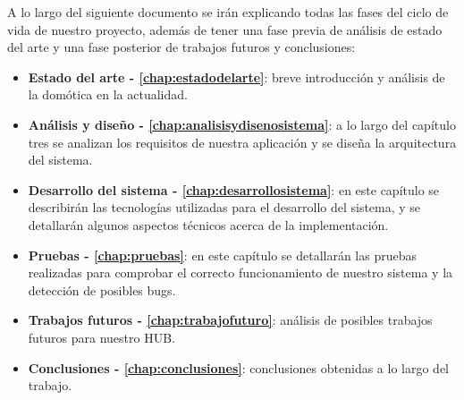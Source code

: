 
A lo largo del siguiente documento se irán explicando todas las fases del ciclo de vida de nuestro proyecto, además de tener una fase previa de análisis de estado del 
arte y una fase posterior de trabajos futuros y conclusiones:
\begin{itemize}
\item\textbf{Estado del arte - \autoref{chap:estadodelarte}}: breve introducción y análisis de la domótica en la actualidad.
\item\textbf{Análisis y diseño - \autoref{chap:analisisydisenosistema}}: a lo largo del capítulo tres se analizan los requisitos de nuestra aplicación y se diseña la arquitectura del sistema.
\item\textbf{Desarrollo del sistema - \autoref{chap:desarrollosistema}}: en este capítulo se describirán las tecnologías utilizadas para el desarrollo del sistema, y se detallarán 
algunos aspectos técnicos acerca de la implementación.
\item\textbf{Pruebas - \autoref{chap:pruebas}}: en este capítulo se detallarán las pruebas realizadas para comprobar el correcto funcionamiento
de nuestro sistema y la detección de posibles bugs.
\item\textbf{Trabajos futuros - \autoref{chap:trabajofuturo}}: análisis de posibles trabajos futuros para nuestro HUB.
\item\textbf{Conclusiones - \autoref{chap:conclusiones}}: conclusiones obtenidas a lo largo del trabajo.
\end{itemize}


\newpage \thispagestyle{empty} %